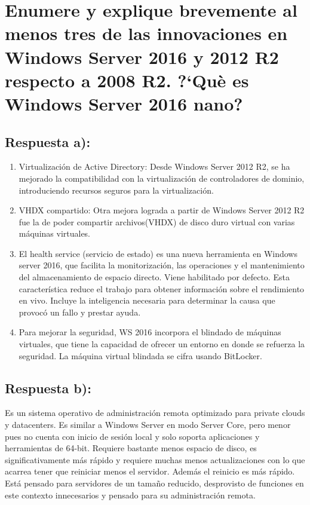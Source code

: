 \section{Enumere y explique brevemente al menos tres de las innovaciones en Windows Server 2016 y 2012 R2 respecto a 2008 R2.
	?`Què es Windows Server 2016 nano?}
\subsection{Respuesta a):}

\begin{enumerate}
\item Virtualización de Active Directory: Desde Windows Server 2012 R2, se ha mejorado la compatibilidad con la virtualización de controladores de dominio, introduciendo recursos seguros para la virtualización.\cite{cuestion3Aa}
\item VHDX compartido: Otra mejora lograda a partir de Windows Server 2012 R2 fue la de poder compartir archivos(VHDX) de disco duro virtual con varias máquinas virtuales.\cite{cuestion3Ab}
\item El health service (servicio de estado) es una nueva herramienta en Windows server 2016, que facilita la monitorización, las operaciones y el mantenimiento del almacenamiento de espacio directo. Viene habilitado por defecto. Esta característica reduce el trabajo para obtener información sobre el rendimiento en vivo. Incluye la inteligencia necesaria para determinar la causa que provocó un fallo y prestar ayuda.\cite{DifWS2016}
\item Para mejorar la seguridad, WS 2016 incorpora el blindado de máquinas virtuales, que tiene la capacidad de ofrecer un entorno en donde se refuerza la seguridad. La máquina virtual blindada se cifra usando BitLocker. \cite{DifWS2016}
\end{enumerate}
\subsection{Respuesta b):}

Es un sistema operativo de administración remota optimizado para private clouds y datacenters. Es similar a Windows Server en modo Server Core, pero menor pues no cuenta con inicio de sesión local y solo soporta aplicaciones y herramientas de 64-bit.
Requiere bastante menos espacio de disco, es significativamente más rápido y requiere muchas menos actualizaciones con lo que acarrea tener que reiniciar menos el servidor. Además el reinicio es más rápido.
Está pensado para servidores de un tamaño reducido, desprovisto de funciones en este contexto innecesarios y pensado para su administración remota.\cite{cuestion3B}

